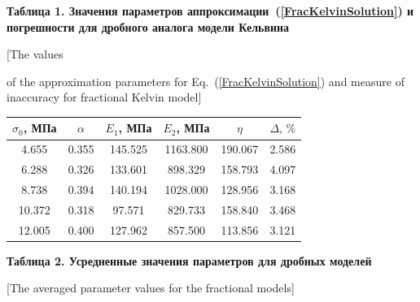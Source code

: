 \documentclass[11pt,a4paper,twoside]{article}
\begin{document}
\begin{center}




{\bf\footnotesize Таблица 1. Значения параметров аппроксимации~(\ref{FracKelvinSolution}) и погрешности для дробного аналога модели Кельвина


[The values \par of the approximation parameters for Eq.~(\ref{FracKelvinSolution}) and measure of inaccuracy for fractional Kelvin model] }	


		


		


		\begin{tabular}{|c||c|c|c|c|c|} 


\hline 


\rule{0mm}{11pt}%


\footnotesize $\sigma_{0}$, МПа & \footnotesize  $\alpha$ & \footnotesize  $E_{1}$, МПа & \footnotesize  $E_{2}$, МПа & \footnotesize  $\eta$ & \footnotesize  $\Delta,\, \%$ \\


			\hline 


			\rule{0mm}{12pt}%


			\phantom{1}4.655 & 0.355 & 145.525 & 1163.800 & 190.067 & 2.586 \\ 


			 \phantom{1}6.288 & 0.326 & 133.601 & \phantom{1}898.329 & 158.793 & 4.097 \\


			 \phantom{1}8.738 & 0.394 & 140.194 & 1028.000 & 128.956 & 3.168 \\


			 10.372 & 0.318 & \phantom{1}97.571 & \phantom{1}829.733 & 158.840 & 3.468 \\


			 12.005 & 0.400 & 127.962 & \phantom{1}857.500 & 113.856 & 3.121 \\


			\hline


		\end{tabular}





\smallskip





{\bf\footnotesize Таблица 2. Усредненные значения параметров для дробных моделей


[The averaged parameter values for the fractional models] }






\end{center}
\end{document}

